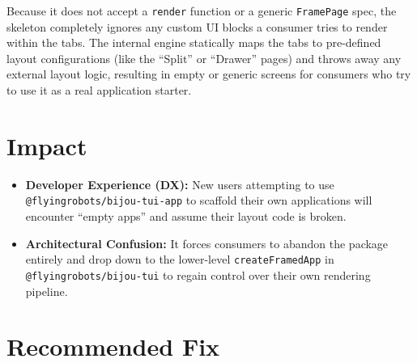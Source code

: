 Because it does not accept a \texttt{r\allowbreak{}e\allowbreak{}n\allowbreak{}d\allowbreak{}e\allowbreak{}r} function or a generic \texttt{F\allowbreak{}r\allowbreak{}a\allowbreak{}m\allowbreak{}e\allowbreak{}P\allowbreak{}a\allowbreak{}g\allowbreak{}e} spec, the skeleton completely ignores any custom UI blocks a consumer tries to render within the tabs. The internal engine statically maps the tabs to pre-defined layout configurations (like the ``Split'' or ``Drawer'' pages) and throws away any external layout logic, resulting in empty or generic screens for consumers who try to use it as a real application starter.

\section{Impact}\label{record-130-impact}

\begin{itemize}
\tightlist
\item
  \textbf{Developer Experience (DX):} New users attempting to use \texttt{@\allowbreak{}f\allowbreak{}l\allowbreak{}y\allowbreak{}i\allowbreak{}n\allowbreak{}g\allowbreak{}r\allowbreak{}o\allowbreak{}b\allowbreak{}o\allowbreak{}t\allowbreak{}s\allowbreak{}/\allowbreak{}b\allowbreak{}i\allowbreak{}j\allowbreak{}o\allowbreak{}u\allowbreak{}-\allowbreak{}t\allowbreak{}u\allowbreak{}i\allowbreak{}-\allowbreak{}a\allowbreak{}p\allowbreak{}p} to scaffold their own applications will encounter ``empty apps'' and assume their layout code is broken.
\item
  \textbf{Architectural Confusion:} It forces consumers to abandon the package entirely and drop down to the lower-level \texttt{c\allowbreak{}r\allowbreak{}e\allowbreak{}a\allowbreak{}t\allowbreak{}e\allowbreak{}F\allowbreak{}r\allowbreak{}a\allowbreak{}m\allowbreak{}e\allowbreak{}d\allowbreak{}A\allowbreak{}p\allowbreak{}p} in \texttt{@\allowbreak{}f\allowbreak{}l\allowbreak{}y\allowbreak{}i\allowbreak{}n\allowbreak{}g\allowbreak{}r\allowbreak{}o\allowbreak{}b\allowbreak{}o\allowbreak{}t\allowbreak{}s\allowbreak{}/\allowbreak{}b\allowbreak{}i\allowbreak{}j\allowbreak{}o\allowbreak{}u\allowbreak{}-\allowbreak{}t\allowbreak{}u\allowbreak{}i} to regain control over their own rendering pipeline.
\end{itemize}

\section{Recommended Fix}\label{record-130-recommended-fix}

